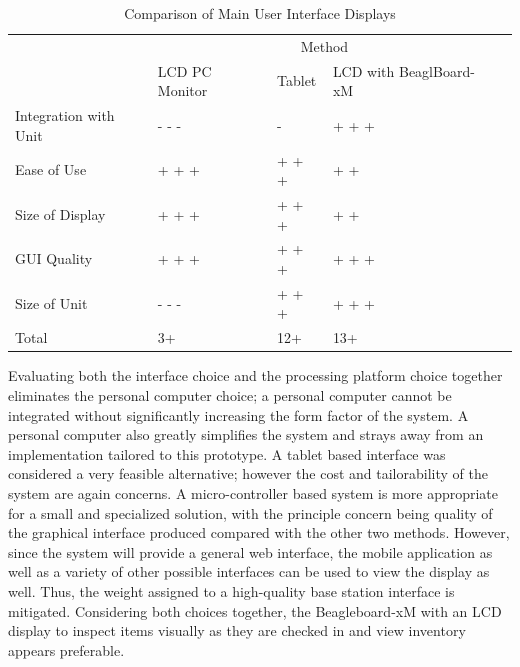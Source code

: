 \documentclass[11pt]{article} %
\begin{document}
\begin{table}[h!]
\vspace{0.5cm}
\caption{Comparison of Main User Interface Displays}
\begin{tabular}{| p{2in} | p{1in} | p{1.5in} | p{1.5in} | p{1.5in} |}
\cline{2-4}
\multicolumn{1}{c}{}&\multicolumn{3}{|c|}{Method} \\
\cline{2-4}
\multicolumn{1}{c|}{}&LCD PC \newline Monitor&Tablet&LCD with \newline BeaglBoard-xM\\
\hline
Integration with Unit&- - -&-&+ + +\\
\hline
Ease of Use&+ + +&+ + +&+ +\\
\hline
Size of Display& + + + &+ + +&+ +\\
\hline
GUI Quality&+ + +&+ + +&+ + +\\
\hline
Size of Unit&- - -&+ + +&+ + +\\
\hline
\hline
Total&3+&12+&13+\\
\hline
\end{tabular}
\label{tab:disp}
\end{table}
\noindent Evaluating both the interface choice and the processing platform choice together eliminates the personal computer choice; a personal computer cannot be integrated without significantly increasing the form factor of the system. A personal computer also greatly simplifies the system and strays away from an implementation tailored to this prototype. A tablet based interface was considered a very feasible alternative; however the cost and tailorability of the system are again concerns. A micro-controller based system is more appropriate for a small and specialized solution, with the principle concern being quality of the graphical interface produced compared with the other two methods. However, since the system will provide a general web interface, the mobile application as well as a variety of other possible interfaces can be used to view the display as well. Thus, the weight assigned to a high-quality base station interface is mitigated. Considering both choices together, the Beagleboard-xM with an LCD display to inspect items visually as they are checked in and view inventory appears preferable.
\end{document}
